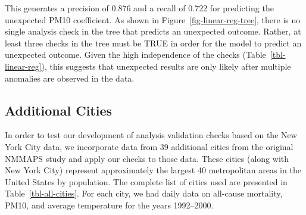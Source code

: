 \documentclass[
  12pt,
]{interact}
\begin{document}
This generates a precision of 0.876 and a recall of 0.722 for predicting
the unexpected PM10 coefficient. As shown in
Figure~\ref{fig-linear-reg-tree}, there is no single analysis check in
the tree that predicts an unexpected outcome. Rather, at least three
checks in the tree must be TRUE in order for the model to predict an
unexpected outcome. Given the high independence of the checks
(Table~\ref{tbl-linear-reg}), this suggests that unexpected results are
only likely after multiple anomalies are observed in the data.

\subsection{Additional Cities}\label{additional-cities}

In order to test our development of analysis validation checks based on
the New York City data, we incorporate data from 39 additional cities
from the original NMMAPS study and apply our checks to those data. These
cities (along with New York City) represent approximately the largest 40
metropolitan areas in the United States by population. The complete list
of cities used are presented in Table~\ref{tbl-all-cities}. For each
city, we had daily data on all-cause mortality, PM10, and average
temperature for the years 1992--2000.
\end{document}
